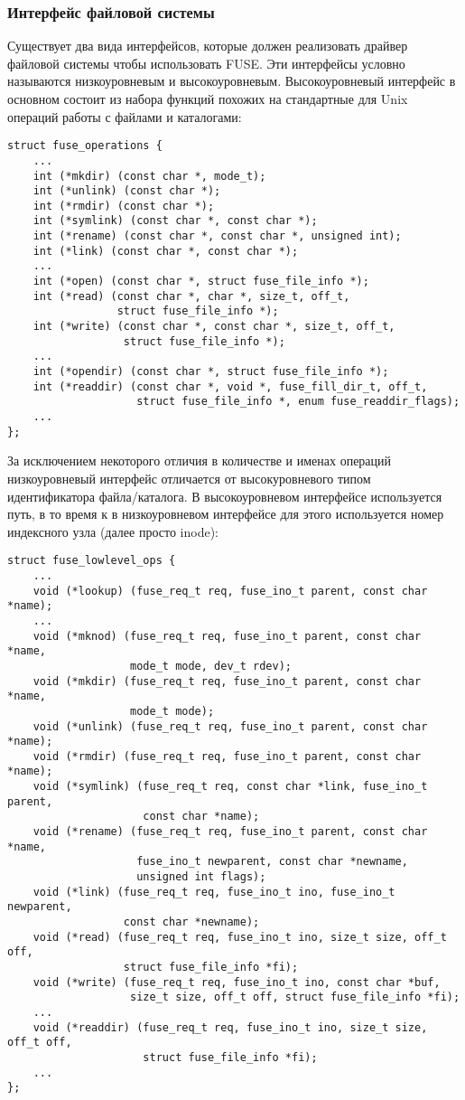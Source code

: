 \subsubsection{Интерфейс файловой системы}

Существует два вида интерфейсов, которые должен реализовать драйвер файловой
системы чтобы использовать FUSE. Эти интерфейсы условно называются
низкоуровневым и высокоуровневым. Высокоуровневый интерфейс в основном состоит
из набора функций похожих на стандартные для Unix операций работы с файлами и
каталогами:
\begin{lstlisting}
struct fuse_operations {
    ...
    int (*mkdir) (const char *, mode_t);
    int (*unlink) (const char *);
    int (*rmdir) (const char *);
    int (*symlink) (const char *, const char *);
    int (*rename) (const char *, const char *, unsigned int);
    int (*link) (const char *, const char *);
    ...
    int (*open) (const char *, struct fuse_file_info *);
    int (*read) (const char *, char *, size_t, off_t,
                 struct fuse_file_info *);
    int (*write) (const char *, const char *, size_t, off_t,
                  struct fuse_file_info *);
    ...
    int (*opendir) (const char *, struct fuse_file_info *);
    int (*readdir) (const char *, void *, fuse_fill_dir_t, off_t,
                    struct fuse_file_info *, enum fuse_readdir_flags);
    ...
};
\end{lstlisting}

За исключением некоторого отличия в количестве и именах операций низкоуровневый
интерфейс отличается от высокуровневого типом идентификатора файла/каталога. В
высокоуровневом интерфейсе используется путь, в то время к в низкоуровневом
интерфейсе для этого используется номер индексного узла (далее просто inode):
\begin{lstlisting}
struct fuse_lowlevel_ops {
    ...
    void (*lookup) (fuse_req_t req, fuse_ino_t parent, const char *name);
    ...
    void (*mknod) (fuse_req_t req, fuse_ino_t parent, const char *name,
                   mode_t mode, dev_t rdev);
    void (*mkdir) (fuse_req_t req, fuse_ino_t parent, const char *name,
                   mode_t mode);
    void (*unlink) (fuse_req_t req, fuse_ino_t parent, const char *name);
    void (*rmdir) (fuse_req_t req, fuse_ino_t parent, const char *name);
    void (*symlink) (fuse_req_t req, const char *link, fuse_ino_t parent,
                     const char *name);
    void (*rename) (fuse_req_t req, fuse_ino_t parent, const char *name,
                    fuse_ino_t newparent, const char *newname,
                    unsigned int flags);
    void (*link) (fuse_req_t req, fuse_ino_t ino, fuse_ino_t newparent,
                  const char *newname);
    void (*read) (fuse_req_t req, fuse_ino_t ino, size_t size, off_t off,
                  struct fuse_file_info *fi);
    void (*write) (fuse_req_t req, fuse_ino_t ino, const char *buf,
                   size_t size, off_t off, struct fuse_file_info *fi);
    ...
    void (*readdir) (fuse_req_t req, fuse_ino_t ino, size_t size, off_t off,
                     struct fuse_file_info *fi);
    ...
};
\end{lstlisting}


